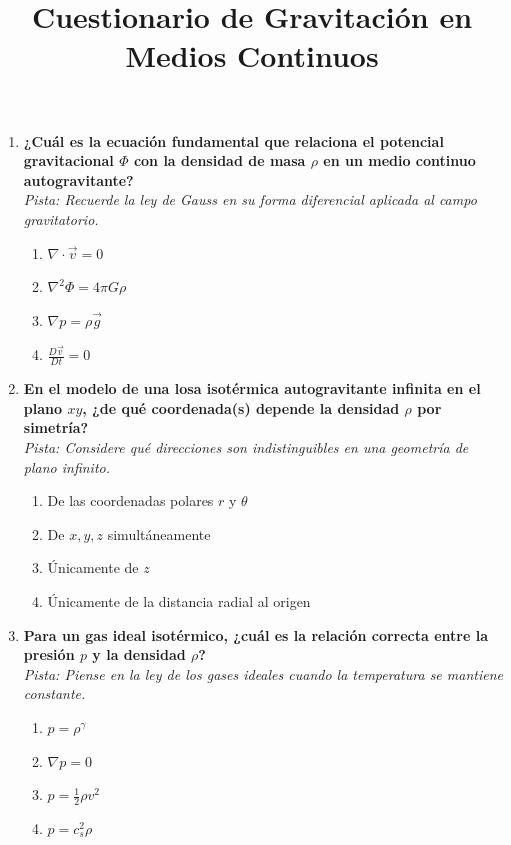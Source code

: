 \documentclass[12pt,a4paper]{article}
\title{\textbf{Cuestionario de Gravitación en Medios Continuos}}
\author{}
\date{}
\begin{document}
\maketitle
\thispagestyle{empty}

\begin{enumerate}[label=\textbf{\arabic*.}, itemsep=1.5em]

\item \textbf{¿Cuál es la ecuación fundamental que relaciona el potencial gravitacional $\Phi$ con la densidad de masa $\rho$ en un medio continuo autogravitante?} \\
\textit{Pista: Recuerde la ley de Gauss en su forma diferencial aplicada al campo gravitatorio.}
\begin{enumerate}[label=\alph*), leftmargin=*]
    \item $\nabla \cdot \vec{v} = 0$
    \item $\nabla^2 \Phi = 4\pi G \rho$
    \item $\nabla p = \rho \vec{g}$
    \item $\frac{D\vec{v}}{Dt} = 0$
\end{enumerate}

\item \textbf{En el modelo de una losa isotérmica autogravitante infinita en el plano $xy$, ¿de qué coordenada(s) depende la densidad $\rho$ por simetría?} \\
\textit{Pista: Considere qué direcciones son indistinguibles en una geometría de plano infinito.}
\begin{enumerate}[label=\alph*), leftmargin=*]
    \item De las coordenadas polares $r$ y $\theta$
    \item De $x, y, z$ simultáneamente
    \item Únicamente de $z$
    \item Únicamente de la distancia radial al origen
\end{enumerate}

\item \textbf{Para un gas ideal isotérmico, ¿cuál es la relación correcta entre la presión $p$ y la densidad $\rho$?} \\
\textit{Pista: Piense en la ley de los gases ideales cuando la temperatura se mantiene constante.}
\begin{enumerate}[label=\alph*), leftmargin=*]
    \item $p = \rho^\gamma$
    \item $\nabla p = 0$
    \item $p = \frac{1}{2} \rho v^2$
    \item $p = c_s^2 \rho$
\end{enumerate}


\end{enumerate}
\end{document}
